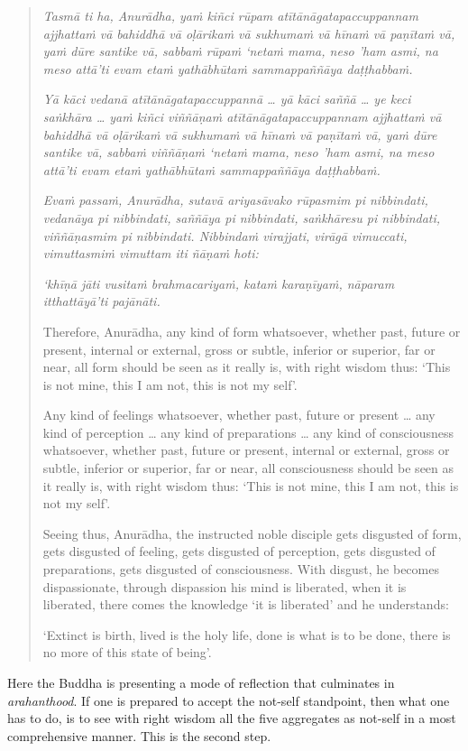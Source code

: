 \begin{quote}
\emph{Tasmā ti ha, Anurādha, yaṁ kiñci rūpam atītānāgatapaccuppannam ajjhattaṁ vā bahiddhā vā oḷārikaṁ vā sukhumaṁ vā hīnaṁ vā paṇītaṁ vā, yaṁ dūre santike vā, sabbaṁ rūpaṁ `netaṁ mama, neso 'ham asmi, na meso attā'ti evam etaṁ yathābhūtaṁ sammappaññāya daṭṭhabbaṁ.}

\emph{Yā kāci vedanā atītānāgatapaccuppannā \ldots{} yā kāci saññā \ldots{} ye keci saṅkhāra \ldots{} yaṁ kiñci viññāṇaṁ atītānāgatapaccuppannam ajjhattaṁ vā bahiddhā vā oḷārikaṁ vā sukhumaṁ vā hīnaṁ vā paṇītaṁ vā, yaṁ dūre santike vā, sabbaṁ viññāṇaṁ `netaṁ mama, neso 'ham asmi, na meso attā'ti evam etaṁ yathābhūtaṁ sammappaññāya daṭṭhabbaṁ.}

\emph{Evaṁ passaṁ, Anurādha, sutavā ariyasāvako rūpasmim pi nibbindati, vedanāya pi nibbindati, saññāya pi nibbindati, saṅkhāresu pi nibbindati, viññāṇasmim pi nibbindati. Nibbindaṁ virajjati, virāgā vimuccati, vimuttasmiṁ vimuttam iti ñāṇaṁ hoti:}

\emph{`khīṇā jāti vusitaṁ brahmacariyaṁ, kataṁ karaṇīyaṁ, nāparam itthattāyā'ti pajānāti.}

Therefore, Anurādha, any kind of form whatsoever, whether past, future or present, internal or external, gross or subtle, inferior or superior, far or near, all form should be seen as it really is, with right wisdom thus: `This is not mine, this I am not, this is not my self'.

Any kind of feelings whatsoever, whether past, future or present \ldots{} any kind of perception \ldots{} any kind of preparations \ldots{} any kind of consciousness whatsoever, whether past, future or present, internal or external, gross or subtle, inferior or superior, far or near, all consciousness should be seen as it really is, with right wisdom thus: `This is not mine, this I am not, this is not my self'.

Seeing thus, Anurādha, the instructed noble disciple gets disgusted of form, gets disgusted of feeling, gets disgusted of perception, gets disgusted of preparations, gets disgusted of consciousness. With disgust, he becomes dispassionate, through dispassion his mind is liberated, when it is liberated, there comes the knowledge `it is liberated' and he understands:

`Extinct is birth, lived is the holy life, done is what is to be done, there is no more of this state of being'.
\end{quote}

Here the Buddha is presenting a mode of reflection that culminates in \emph{arahanthood}. If one is prepared to accept the not-self standpoint, then what one has to do, is to see with right wisdom all the five aggregates as not-self in a most comprehensive manner. This is the second step.

